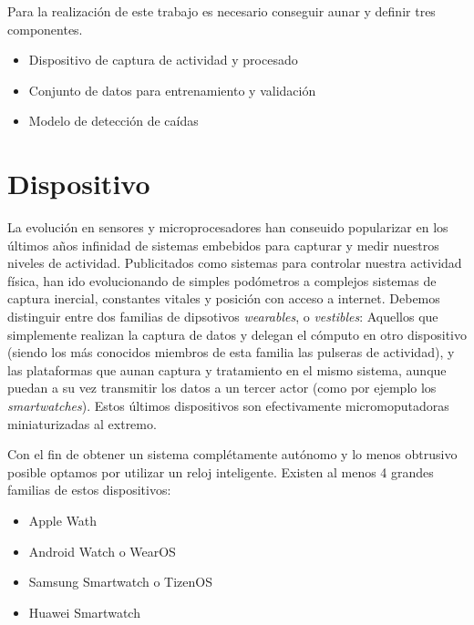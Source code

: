 \documentclass[../tfm.tex]{subfiles}
\begin{document}

Para la realización de este trabajo es necesario conseguir aunar y definir tres componentes.
\begin{itemize}
  \item Dispositivo de captura de actividad y procesado
  \item Conjunto de datos para entrenamiento y validación
  \item Modelo de detección de caídas
\end{itemize}

\section{Dispositivo}\label{req_hardware}

La evolución en sensores y microprocesadores han conseuido popularizar en los últimos años infinidad de sistemas embebidos para capturar y medir nuestros niveles de actividad. Publicitados como sistemas para controlar nuestra actividad física, han ido evolucionando de simples podómetros a complejos sistemas de captura inercial, constantes vitales y posición con acceso a internet. Debemos distinguir entre dos familias de dipsotivos \textit{wearables}, o \textit{vestibles}: Aquellos que simplemente realizan la captura de datos y delegan el cómputo en otro dispositivo (siendo los más conocidos miembros de esta familia las pulseras de actividad), y las plataformas que aunan captura y tratamiento en el mismo sistema, aunque puedan a su vez transmitir los datos a un tercer actor (como por ejemplo los \textit{smartwatches}). Estos últimos dispositivos son efectivamente micromoputadoras miniaturizadas al extremo.

Con el fin de obtener un sistema complétamente autónomo y lo menos obtrusivo posible  optamos por utilizar un reloj inteligente. Existen al menos 4 grandes familias de estos dispositivos:

\begin{itemize}
  \item{Apple Wath}
  \item{Android Watch o WearOS}
  \item{Samsung Smartwatch o TizenOS}
  \item{Huawei Smartwatch}
\end{itemize}
\end{document}
